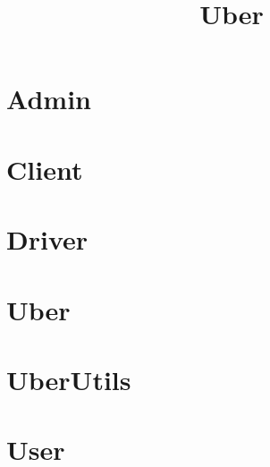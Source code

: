 \documentclass{article}
\begin{document}
\title{Uber}
\author{}
\maketitle
\tableofcontents

\section{Admin}

\section{Client}

\section{Driver}

\section{Uber}

\section{UberUtils}

\section{User}

\end{document}
